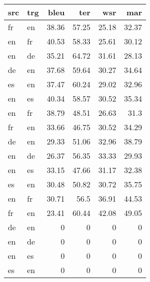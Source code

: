\begin{tabular}{llrrrr}
\hline
 src   & trg   &   bleu &   ter &   wsr &   mar \\
\hline
 fr    & en    &  38.36 & 57.25 & 25.18 & 32.37 \\
 en    & fr    &  40.53 & 58.33 & 25.61 & 30.12 \\
 en    & de    &  35.21 & 64.72 & 31.61 & 28.13 \\
 de    & en    &  37.68 & 59.64 & 30.27 & 34.64 \\
 es    & en    &  37.47 & 60.24 & 29.02 & 32.96 \\
 en    & es    &  40.34 & 58.57 & 30.52 & 35.34 \\
 en    & fr    &  38.79 & 48.51 & 26.63 & 31.3  \\
 fr    & en    &  33.66 & 46.75 & 30.52 & 34.29 \\
 de    & en    &  29.33 & 51.06 & 32.96 & 38.79 \\
 en    & de    &  26.37 & 56.35 & 33.33 & 29.93 \\
 en    & es    &  33.15 & 47.66 & 31.17 & 32.38 \\
 es    & en    &  30.48 & 50.82 & 30.72 & 35.75 \\
 en    & fr    &  30.71 & 56.5  & 36.91 & 44.53 \\
 fr    & en    &  23.41 & 60.44 & 42.08 & 49.05 \\
 de    & en    &   0    &  0    &  0    &  0    \\
 en    & de    &   0    &  0    &  0    &  0    \\
 en    & es    &   0    &  0    &  0    &  0    \\
 es    & en    &   0    &  0    &  0    &  0    \\
\hline
\end{tabular}